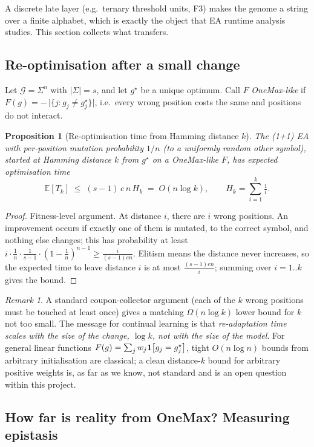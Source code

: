 \documentclass[11pt,a4paper]{article}
\theoremstyle{definition}
\theoremstyle{plain}
\newtheorem{proposition}[definition]{Proposition}
\theoremstyle{remark}
\newtheorem{remark}[definition]{Remark}
\newcommand{\E}{\mathbb{E}}
\newcommand{\ind}[1]{\one\!\left[#1\right]}
\newcommand{\Gen}{\mathcal{G}}          %
\begin{document}
A discrete late layer (e.g.\ ternary threshold units, F3) makes the genome a string over a finite alphabet, which is exactly the object that EA runtime analysis studies. This section collects what transfers.

\subsection{Re-optimisation after a small change}

Let $\Gen=\Sigma^n$ with $|\Sigma|=s$, and let $g^\star$ be a unique optimum. Call $F$ \emph{OneMax-like} if $F(g) = -\,\big|\{j : g_j \neq g^\star_j\}\big|$, i.e.\ every wrong position costs the same and positions do not interact.

\begin{proposition}[Re-optimisation time from Hamming distance $k$]
\label{prop:reopt}
The (1+1) EA with per-position mutation probability $1/n$ (to a uniformly random other symbol), started at Hamming distance $k$ from $g^\star$ on a OneMax-like $F$, has expected optimisation time
\[
\E[T_k] \;\le\; (s-1)\,e\,n\,H_k \;=\; O(n\log k), \qquad H_k = \textstyle\sum_{i=1}^k \tfrac1i .
\]
\end{proposition}
\begin{proof}
Fitness-level argument. At distance $i$, there are $i$ wrong positions. An improvement occurs if exactly one of them is mutated, to the correct symbol, and nothing else changes; this has probability at least $i\cdot\frac1n\cdot\frac{1}{s-1}\cdot(1-\frac1n)^{n-1}\ge \frac{i}{(s-1)en}$. Elitism means the distance never increases, so the expected time to leave distance $i$ is at most $\frac{(s-1)en}{i}$; summing over $i=1..k$ gives the bound.
\end{proof}

\begin{remark}
A standard coupon-collector argument (each of the $k$ wrong positions must be touched at least once) gives a matching $\Omega(n\log k)$ lower bound for $k$ not too small. The message for continual learning is that \emph{re-adaptation time scales with the size of the change, $\log k$, not with the size of the model}. For general linear functions $F(g)=\sum_j w_j\ind{g_j=g^\star_j}$, tight $O(n\log n)$ bounds from arbitrary initialisation are classical; a clean distance-$k$ bound for arbitrary positive weights is, as far as we know, not standard and is an open question within this project.
\end{remark}

\subsection{How far is reality from OneMax? Measuring epistasis}
\end{document}
